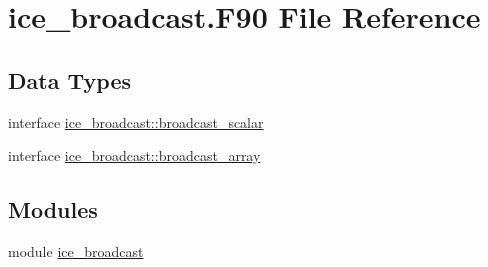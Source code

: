 \hypertarget{ice__broadcast_8F90}{
\section{ice\_\-broadcast.F90 File Reference}
\label{ice__broadcast_8F90}
}
\subsection*{Data Types}
\begin{DoxyCompactItemize}
\item 
interface \hyperlink{interfaceice__broadcast_1_1broadcast__scalar}{ice\_\-broadcast::broadcast\_\-scalar}
\item 
interface \hyperlink{interfaceice__broadcast_1_1broadcast__array}{ice\_\-broadcast::broadcast\_\-array}
\end{DoxyCompactItemize}
\subsection*{Modules}
\begin{DoxyCompactItemize}
\item 
module \hyperlink{namespaceice__broadcast}{ice\_\-broadcast}
\end{DoxyCompactItemize}

